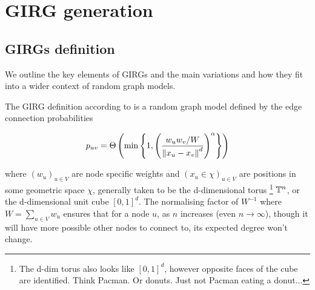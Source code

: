 \chapter{GIRG generation}
\minitoc
\section{GIRGs definition}
\label{sec:GIRG_def}
We outline the key elements of GIRGs and the main variations and how they fit into a wider context of random graph models.

The GIRG definition according to \cite{bringmann2019geometric} is a random graph model defined by the edge connection probabilities


\begin{equation}
    p_{uv} = \Theta \left ( \min \left \{ 
        1,
        \left (
            \frac{w_u w_v / W}{\left\lVert x_u - x_v\right\rVert^d}
        \right )^\alpha    
    \right \}
    \right )
\end{equation}

where $(w_u)_{u \in V}$ are node specific weights and $(x_u \in \chi)_{u \in V}$ are positions in some geometric space $\chi$, generally taken to be the d-dimensional torus
\footnote{The d-dim torus also looks like $[0, 1]^d$, however opposite faces of the cube are identified. Think Pacman. Or donuts. Just not Pacman eating a donut...}
$\mathbb{T}^n$, or the d-dimensional unit cube $[0, 1]^d$.
The normalising factor of $W^{-1}$ where $W = \sum_{u \in V} w_u$ ensures that for a node $u$, as $n$ increases (even $n \to \infty$), though it will have more possible other nodes to connect to, its expected degree won't change.



